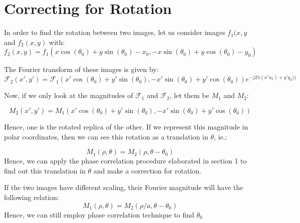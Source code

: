 \documentclass[a4paper]{article}
\begin{document}
\section{Correcting for Rotation}
In order to find the rotation between two images, let us consider images $f_1(x,y$  and $f_2(x,y)$ with:
\[f_2(x,y) = f_1(x\operatorname{cos}(\theta_0) + y\operatorname{sin}(\theta_0) - x_0,-x\operatorname{sin}(\theta_0) + y\operatorname{cos}(\theta_0) - y_0)\]

The Fourier transform of these images is given by:
\[\mathscr{F}_2(x',y') = \mathscr{F}_1(x'\operatorname{cos}(\theta_0) + y'\operatorname{sin}(\theta_0),-x'\operatorname{sin}(\theta_0) + y'\operatorname{cos}(\theta_0)) e^{-j2\pi(x'x_0) + y'y_0))}\]

Now, if we only look at the magnitudes of $\mathscr{F}_1$ and $\mathscr{F}_2$, let them be $M_1$ and $M_2$:

\[M_2(x',y') = M_1(x'\operatorname{cos}(\theta_0) + y'\operatorname{sin}(\theta_0),-x'\operatorname{sin}(\theta_0) + y'\operatorname{cos}(\theta_0)) \]

Hence, one is the rotated replica of the other. If we represent this magnitude in polar coordinates, then we can see this rotation as a translation in $\theta$, ie.:

\[M_1(\rho, \theta) = M_2(\rho, \theta - \theta_0)\]
Hence, we can apply the phase correlation procedure elaborated in section 1 to find out this translation in $\theta$ and make a correction for rotation.

If the two images have different scaling, their Fourier magnitude will have the following relation:
\[M_1(\rho, \theta) = M_2(\rho/a, \theta - \theta_0)\]
Hence, we can still employ phase correlation technique to find $\theta_0$
\end{document}
